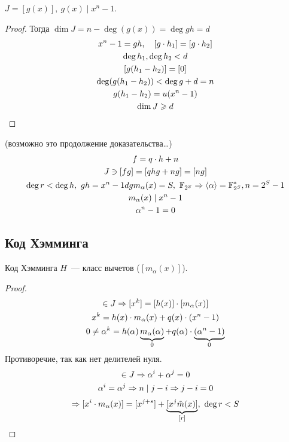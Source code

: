 \begin{theorem}
  $J = [g(x)], \ g(x) \mid x^n - 1$.
\end{theorem}

\begin{proof}
  Тогда $\dim J = n - \deg (g(x)) = \deg gh = d$
  \begin{gather}
    x^n - 1 = gh, \quad [g \cdot h_1] = [g \cdot h_2] \\
    \deg h_1, \deg h_2 < d \\
    [g(h_1 - h_2)] = [0] \\
    \deg (g(h_1 - h_2)) < \deg g + d = n \\
    g(h_1 - h_2) = u(x^n - 1) \\
    \dim J \geqslant d
  \end{gather}
\end{proof}

\begin{proposition} (возможно это продолжение доказательства\dots)
  \begin{gather}
    f = q \cdot h + n \\
    J \ni [fg] = [qhg + ng] = [ng] \\
    \deg r < \deg h, \ gh = x^n - 1
    dg m_\alpha (x) = S, \ \mathbb{F}_{2^S} \Rightarrow \langle \alpha \rangle = \mathbb{F}^*_{2^S}, n = 2^S - 1 \\
    m_\alpha (x) \mid x^n - 1 \\
    \alpha^n - 1 = 0
  \end{gather}
\end{proposition}

\subsection{Код Хэмминга}
\begin{definition}
  Код Хэмминга $H$~--- класс вычетов ($[m_\alpha(x)]$).
\end{definition}
\begin{proof}
  \begin{gather}
    [x^k] \in J \Ra [x^k] = [h(x)] \cd [m_\alpha(x)] \\
    x^k = h(x) \cd m_\alpha(x) + q(x) \cd (x^n - 1) \\
    0 \neq \alpha^k = h(\alpha) \underbrace{m_\alpha(\alpha)}_{0} + q(\alpha) \cd \underbrace{(\alpha^n - 1)}_{0}
  \end{gather}
  Противоречие, так как нет делителей нуля.
  \begin{gather}
    [x^i + x^j] \in J \Ra \alpha^i + \alpha^j = 0 \\
    \alpha^i = \alpha^j \Ra n \mid j - i \Ra j - i = 0
  \end{gather}
  \[\Ra [x^i \cd m_\alpha(x)] = [x^{j + s}] + \underbrace{[x^j \tilde m(x)]}_{[r]}, \ \deg r < S\]
\end{proof}

